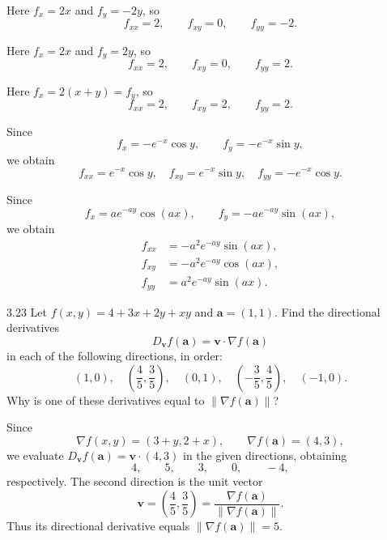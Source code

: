 \documentclass[11pt,oneside]{article}
\begin{document}
\begin{solution}
\begin{problemsubparts}
    \item Here $f_x=2x$ and $f_y=-2y$, so
    \[
        \boxed{f_{xx}=2,\qquad f_{xy}=0,\qquad f_{yy}=-2}.
    \]

    \item Here $f_x=2x$ and $f_y=2y$, so
    \[
        \boxed{f_{xx}=2,\qquad f_{xy}=0,\qquad f_{yy}=2}.
    \]

    \item Here $f_x=2(x+y)=f_y$, so
    \[
        \boxed{f_{xx}=2,\qquad f_{xy}=2,\qquad f_{yy}=2}.
    \]

    \item Since
    \[
        f_x=-e^{-x}\cos y,
        \qquad
        f_y=-e^{-x}\sin y,
    \]
    we obtain
    \[
        \boxed{f_{xx}=e^{-x}\cos y,\quad f_{xy}=e^{-x}\sin y,\quad f_{yy}=-e^{-x}\cos y}.
    \]

    \item Since
    \[
        f_x=ae^{-ay}\cos(ax),
        \qquad
        f_y=-ae^{-ay}\sin(ax),
    \]
    we obtain
    \[
        \boxed{\begin{aligned}
            f_{xx}&=-a^2e^{-ay}\sin(ax),\\
            f_{xy}&=-a^2e^{-ay}\cos(ax),\\
            f_{yy}&=a^2e^{-ay}\sin(ax).
        \end{aligned}}
    \]
\end{problemsubparts}
\end{solution}

\begin{problem}{3.23}
Let $f(x,y)=4+3x+2y+xy$ and $\mathbf a=(1,1)$. Find the directional derivatives
\[
    D_{\mathbf v}f(\mathbf a)=\mathbf v\cdot\nabla f(\mathbf a)
\]
in each of the following directions, in order:
\[
    (1,0),\quad \left(\frac45,\frac35\right),\quad (0,1),\quad
    \left(-\frac35,\frac45\right),\quad (-1,0).
\]
Why is one of these derivatives equal to $\|\nabla f(\mathbf a)\|$?
\end{problem}

\begin{solution}
Since
\[
    \nabla f(x,y)=(3+y,2+x),
    \qquad
    \nabla f(\mathbf a)=(4,3),
\]
we evaluate $D_{\mathbf v}f(\mathbf a)=\mathbf v\cdot(4,3)$ in the given directions, obtaining
\[
    \boxed{4,\qquad5,\qquad3,\qquad0,\qquad-4},
\]
respectively. The second direction is the unit vector
\[
    \mathbf v=\left(\frac45,\frac35\right)
    =\frac{\nabla f(\mathbf a)}{\|\nabla f(\mathbf a)\|}.
\]
Thus its directional derivative equals $\|\nabla f(\mathbf a)\|=5$.
\end{solution}
\end{document}
